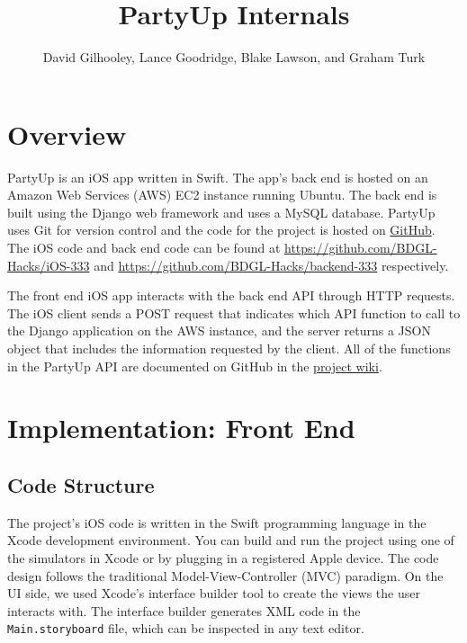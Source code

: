 \documentclass[12pt]{article}
\title{PartyUp Internals}
\author{David Gilhooley, Lance Goodridge, Blake Lawson, and Graham Turk}
\begin{document}
\pagestyle{plain}

\maketitle


\section{Overview}

PartyUp is an iOS app written in Swift.
The app's back end is hosted on an Amazon Web Services (AWS)
EC2 instance running Ubuntu.
The back end is built using the Django web framework and uses
a MySQL database.
PartyUp uses Git for version control and the code for the project is 
hosted on \href{https://github.com/}{GitHub}.
The iOS code and back end code can be found at 
\url{https://github.com/BDGL-Hacks/iOS-333} and
\url{https://github.com/BDGL-Hacks/backend-333} respectively.

The front end iOS app interacts with the back end API through HTTP requests.
The iOS client sends a POST request that indicates which API function to call 
to the Django application on the AWS instance, and the server returns a JSON object that 
includes the information requested by the client.
All of the functions in the PartyUp API are documented on GitHub
in the \href{https://github.com/BDGL-Hacks/backend-333/wiki}{project wiki}.


\section{Implementation: Front End}

\subsection{Code Structure}
The project's iOS code is written in the Swift programming language in the Xcode development environment.
You can build and run the project using one of the simulators in Xcode or
by plugging in a registered Apple device.
The code design follows the traditional Model-View-Controller (MVC) paradigm.
On the UI side, we used Xcode's interface builder tool to
create the views the user interacts with.
The interface builder generates XML code in the \texttt{Main.storyboard} file,
which can be inspected in any text editor.
\end{document}
